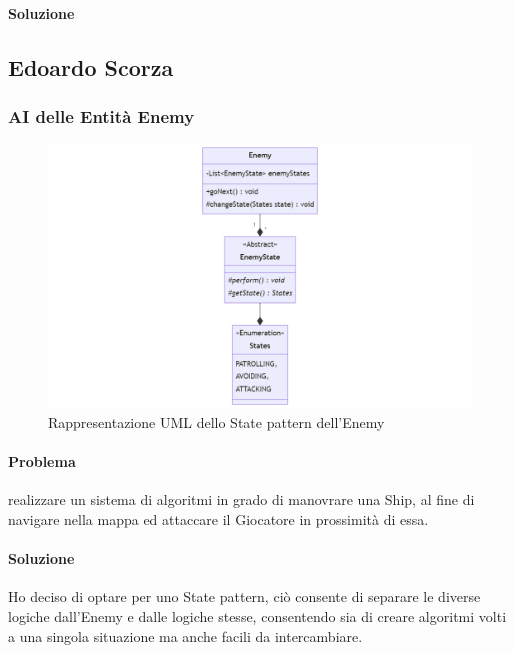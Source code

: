 \documentclass[a4paper,12pt]{report}
\begin{document}
\paragraph{Soluzione}

\subsection*{Edoardo Scorza}
\subsubsection*{AI delle Entità Enemy}
\begin{figure}[H]
	\centering{}
	\includegraphics[width=\textwidth]{img/Enemy.png}
	\caption{Rappresentazione UML dello State pattern dell'Enemy}
	\label{img:Enemy}
\end{figure}
\paragraph{Problema} realizzare un sistema di algoritmi in grado di manovrare una Ship, al fine di navigare nella mappa ed attaccare il Giocatore in prossimità di essa.
\paragraph{Soluzione} Ho deciso di optare per uno State pattern, ciò consente di separare le diverse logiche dall'Enemy e dalle logiche stesse, consentendo sia di creare algoritmi volti a una singola situazione ma anche facili da intercambiare.
\end{document}
